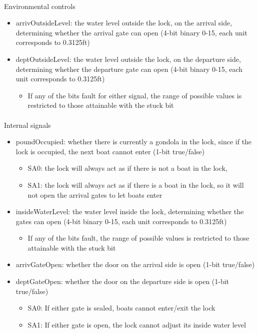 \documentclass{article}
\begin{document}
      \paragraph{} Environmental controls
      \begin{itemize}
        \item arrivOutsideLevel: the water level outside the lock, on the arrival side, determining whether the arrival gate can open (4-bit binary 0-15, each unit corresponds to 0.3125ft)
        \item deptOutsideLevel: the water level outside the lock, on the departure side, determining whether the departure gate can open (4-bit binary 0-15, each unit corresponds to 0.3125ft)
        \begin{itemize}
          \item If any of the bits fault for either signal, the range of possible values is restricted to those attainable with the stuck bit
        \end{itemize}
      \end{itemize}

      \paragraph{} Internal signals
      \begin{itemize}
        \item poundOccupied: whether there is currently a gondola in the lock, since if the lock is occupied, the next boat cannot enter (1-bit true/false)
        \begin{itemize}
          \item SA0: the lock will always act as if there is not a boat in the lock, 
          \item SA1: the lock will always act as if there is a boat in the lock, so it will not open the arrival gates to let boats enter
        \end{itemize}

        \item insideWaterLevel: the water level inside the lock, determining whether the gates can open (4-bit binary 0-15, each unit corresponds to 0.3125ft)
        \begin{itemize}
          \item If any of the bits fault, the range of possible values is restricted to those attainable with the stuck bit
        \end{itemize}

        \item arrivGateOpen: whether the door on the arrival side is open (1-bit true/false)
        \item deptGateOpen: whether the door on the departure side is open (1-bit true/false)
        \begin{itemize}
          \item SA0: If either gate is sealed, boats cannot enter/exit the lock
          \item SA1: If either gate is open, the lock cannot adjust its inside water level
        \end{itemize}
      \end{itemize}
\end{document}
